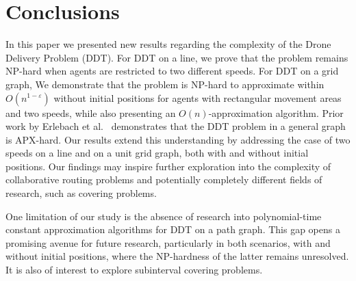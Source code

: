 \section{Conclusions}
In this paper we presented new results regarding the complexity of the Drone Delivery Problem (DDT). For DDT on a line, we prove that the problem remains NP-hard when agents are restricted to two different speeds.  For DDT on a grid graph,
We demonstrate that the problem is NP-hard to approximate within 
$O(n^{1-\varepsilon})$ without initial positions for agents with rectangular movement areas and two speeds, while also presenting an $O(n)$-approximation algorithm. 
Prior work by Erlebach et al.~\cite{erlebach:drones} demonstrates that the DDT problem in a general graph is APX-hard. Our results extend this understanding by addressing the case of two speeds on a line and on a unit grid graph, both with and without initial positions.  
Our findings may inspire further exploration into the complexity of collaborative routing problems and potentially completely different fields of research, such as  covering problems.

One limitation of our study is the absence of research into polynomial-time constant approximation algorithms for DDT on a path graph. This gap opens a promising avenue for future research, particularly in both scenarios, with and without initial positions, where the NP-hardness of the latter remains unresolved. It is also of interest to explore subinterval covering problems. %

